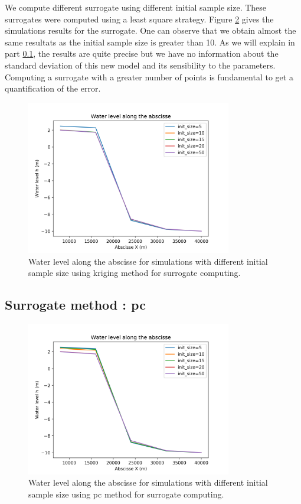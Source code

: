 \documentclass[hidelinks,12pt]{article}
\begin{document}
We compute different surrogate using different initial sample size. These surrogates were computed using a least square strategy. Figure \ref{influence_init_size_method_surrogate_kriging} gives the simulations results for the surrogate. One can observe that we obtain almost the same resultats as the initial sample size is greater than 10. As we will explain in part \ref{}, the results are quite precise but we have no information about the standard deviation of this new model and its sensibility to the parameters. Computing a surrogate with a greater number of points is fundamental to get a quantification of the error.

\begin{figure}[!t]
\centering
\includegraphics[width=0.8\textwidth]{images/influence_init_size_method_surrogate_kriging.png}
\caption{Water level along the abscisse for simulations with different initial sample size using kriging method for surrogate computing.}
\label{influence_init_size_method_surrogate_kriging}
\end{figure}

\subsection{Surrogate method : pc}

\begin{figure}[!t]
\centering
\includegraphics[width=0.8\textwidth]{images/influence_init_size_method_surrogate_pc.png}
\caption{Water level along the abscisse for simulations with different initial sample size using pc method for surrogate computing.}
\label{influence_init_size_method_surrogate_kriging}
\end{figure}
\end{document}
